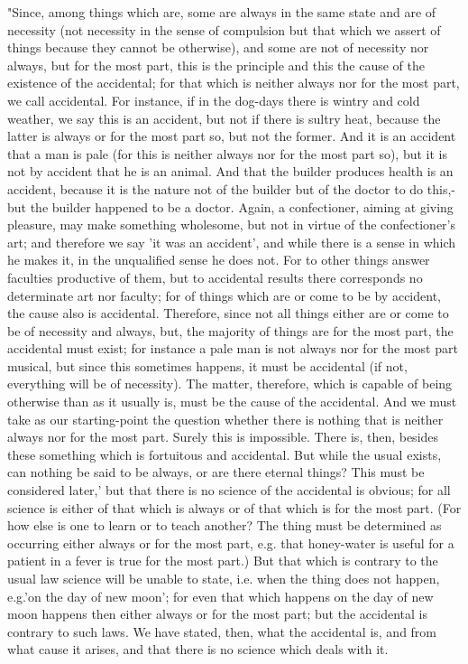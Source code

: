 "Since, among things which are, some are always in the same state
and are of necessity (not necessity in the sense of compulsion but
that which we assert of things because they cannot be otherwise),
and some are not of necessity nor always, but for the most part, this
is the principle and this the cause of the existence of the accidental;
for that which is neither always nor for the most part, we call accidental.
For instance, if in the dog-days there is wintry and cold weather,
we say this is an accident, but not if there is sultry heat, because
the latter is always or for the most part so, but not the former.
And it is an accident that a man is pale (for this is neither always
nor for the most part so), but it is not by accident that he is an
animal. And that the builder produces health is an accident, because
it is the nature not of the builder but of the doctor to do this,-but
the builder happened to be a doctor. Again, a confectioner, aiming
at giving pleasure, may make something wholesome, but not in virtue
of the confectioner's art; and therefore we say 'it was an accident',
and while there is a sense in which he makes it, in the unqualified
sense he does not. For to other things answer faculties productive
of them, but to accidental results there corresponds no determinate
art nor faculty; for of things which are or come to be by accident,
the cause also is accidental. Therefore, since not all things either
are or come to be of necessity and always, but, the majority of things
are for the most part, the accidental must exist; for instance a pale
man is not always nor for the most part musical, but since this sometimes
happens, it must be accidental (if not, everything will be of necessity).
The matter, therefore, which is capable of being otherwise than as
it usually is, must be the cause of the accidental. And we must take
as our starting-point the question whether there is nothing that is
neither always nor for the most part. Surely this is impossible. There
is, then, besides these something which is fortuitous and accidental.
But while the usual exists, can nothing be said to be always, or are
there eternal things? This must be considered later,' but that there
is no science of the accidental is obvious; for all science is either
of that which is always or of that which is for the most part. (For
how else is one to learn or to teach another? The thing must be determined
as occurring either always or for the most part, e.g. that honey-water
is useful for a patient in a fever is true for the most part.) But
that which is contrary to the usual law science will be unable to
state, i.e. when the thing does not happen, e.g.'on the day of new
moon'; for even that which happens on the day of new moon happens
then either always or for the most part; but the accidental is contrary
to such laws. We have stated, then, what the accidental is, and from
what cause it arises, and that there is no science which deals with
it. 

